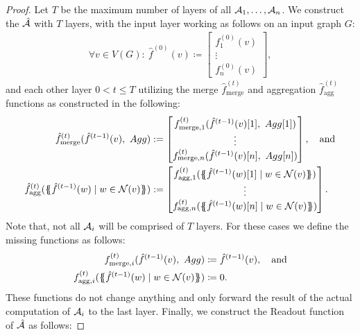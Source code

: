 \begin{proof}
    Let $T$ be the maximum number of layers of all $\mathcal{A}_1, \dots, \mathcal{A}_n$. We construct the \gnn $\hat{\mathcal{A}}$ with $T$ layers, with the input layer working as follows on an input graph $G$:
    \begin{align*}
        \forall v \in V(G): \ \hat{f}^{(0)}(v) \coloneqq \begin{bmatrix}
            f^{(0)}_1(v)\\
            \vdots\\
            f^{(0)}_n(v)
        \end{bmatrix},
    \end{align*}
    and each other layer $0 < t \leq T$ utilizing the merge $\hat{f}^{(t)}_{\text{merge}}$ and aggregation $\hat{f}^{(t)}_{\text{agg}}$ functions as constructed in the following:
    \begin{align*}
        \hat{f}^{(t)}_{\text{merge}} (\hat{f}^{(t-1)}(v), \ Agg) &:= \begin{bmatrix}
            f^{(t)}_{\text{merge}, 1}(\hat{f}^{(t-1)}(v)[1],\ Agg[1])\\
            \vdots\\
            f^{(t)}_{\text{merge}, n}(\hat{f}^{(t-1)}(v)[n],\ Agg[n])
        \end{bmatrix},\quad \text{and}\\
        \hat{f}^{(t)}_{\text{agg}}(\MSopen \hat{f}^{(t-1)}(w) \mid w \in \mathcal{N}(v) \MSclose ) &:= \begin{bmatrix}
            f^{(t)}_{\text{agg}, 1}(\MSopen \hat{f}^{(t-1)}(w)[1] \mid w \in \mathcal{N}(v) \MSclose)\\
            \vdots\\
            f^{(t)}_{\text{agg}, n}(\MSopen \hat{f}^{(t-1)}(w)[n] \mid w \in \mathcal{N}(v) \MSclose)
        \end{bmatrix}.
    \end{align*}
    Note that, not all $\mathcal{A}_i$ will be comprised of $T$ layers. For these cases we define the missing functions as follows:
    \begin{align*}
        f^{(t)}_{\text{merge}, i}(\hat{f}^{(t-1)}(v), \ Agg) &\coloneqq \hat{f}^{(t-1)}(v), \quad \text{and}\\
        f^{(t)}_{\text{agg}, i}(\{\!\!\{ \hat{f}^{(t-1)}(w) \mid w \in \mathcal{N}(v) \}\!\!\}) &\coloneqq 0.
    \end{align*}
    These functions do not change anything and only forward the result of the actual computation of $\mathcal{A}_i$ to the last layer. Finally, we construct the \textsf{Readout} function of $\hat{\mathcal{A}}$ as follows:

\end{proof}
